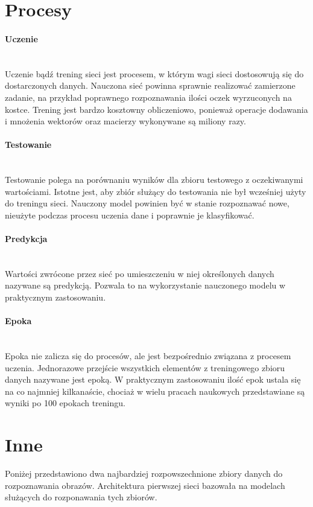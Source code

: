 \section{Procesy}

\paragraph{Uczenie} \mbox{}\\
Uczenie bądź trening sieci jest procesem, w którym wagi sieci dostosowują się do dostarczonych danych.
Nauczona sieć powinna sprawnie realizować zamierzone zadanie, na przykład poprawnego
rozpoznawania ilości oczek wyrzuconych na kostce. Trening jest bardzo kosztowny obliczeniowo,
ponieważ operacje dodawania i mnożenia wektorów oraz macierzy wykonywane są miliony razy.

\paragraph{Testowanie} \mbox{}\\
Testowanie polega na porównaniu wyników dla zbioru testowego z oczekiwanymi wartościami.
Istotne jest, aby zbiór służący do testowania nie był wcześniej użyty do treningu sieci.
Nauczony model powinien być w stanie rozpoznawać nowe, nieużyte podczas procesu uczenia
dane i poprawnie je klasyfikować.

\paragraph{Predykcja} \mbox{}\\
Wartości zwrócone przez sieć po umieszczeniu w niej określonych danych nazywane są
predykcją. Pozwala to na wykorzystanie nauczonego modelu w praktycznym zastosowaniu.

\paragraph{Epoka} \mbox{}\\
Epoka nie zalicza się do procesów, ale jest bezpośrednio związana z procesem uczenia.
Jednorazowe przejście wszystkich elementów z treningowego zbioru danych nazywane jest epoką.
W praktycznym zastosowaniu ilość epok ustala się na co najmniej kilkanaście, chociaż w
wielu pracach naukowych przedstawiane są wyniki po 100 epokach treningu.

\section{Inne}
Poniżej przedstawiono dwa najbardziej rozpowszechnione zbiory danych do rozpoznawania obrazów.
Architektura pierwszej sieci bazowała na modelach służących do rozponawania tych zbiorów.

